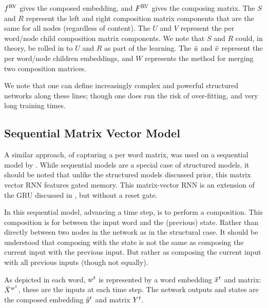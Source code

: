 \documentclass[12pt,parskip]{komatufte}
\begin{document}
$\d f_{RV}$ gives the composed embedding, and $\d F_{RV}$ gives the composing matrix.
The $S$ and $R$ represent the left and right composition matrix components that are the same for all nodes (regardless of content).
The $U$ and $V$ represent the per word/node child composition matrix components.
We note that $S$ and $R$ could, in theory, be rolled in to $U$ and $R$ as part of the learning.
The $\tilde{u}$ and $\tilde{v}$ represent the per word/node children embeddings,
and $W$ represents the method for merging two composition matrices.

We note that one can define increasingly complex and powerful structured networks along these lines; though one does run the risk of over-fitting, and very long training times.

\subsection{Sequential Matrix Vector Model}
A similar approach, of capturing a per word matrix, 
was used on a sequential model by .
While sequential models are a special case of structured models,
it should be noted that unlike the structured models discussed prior,
this matrix vector RNN features gated memory.
This matrix-vector RNN is an extension of the GRU discussed in , but without a reset gate.


In this sequential model, advancing a time step, is to perform a composition.
This composition is for between the input word and the (previous) state.
Rather than directly between two nodes in the network as in the structural case.
It should be understood that composing with the state is not the same as composing the current input with the previous input.
But rather as composing the current input with all previous inputs (though not equally).

As depicted in  each word, $\n w_t$ is represented by a word embedding $\nv x_{t}$ and matrix: $\nv X_{\n w_t}$, these are the inputs at each time step.
The network outputs and states are the composed embedding $\n \hat{y}_t$ and matrix $\n Y_t$.


 
\end{document}

